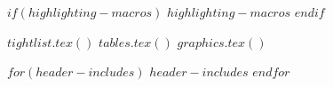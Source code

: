 $if(highlighting-macros)$
$highlighting-macros$
$endif$

$tightlist.tex()$
$tables.tex()$
$graphics.tex()$

$for(header-includes)$
$header-includes$
$endfor$
